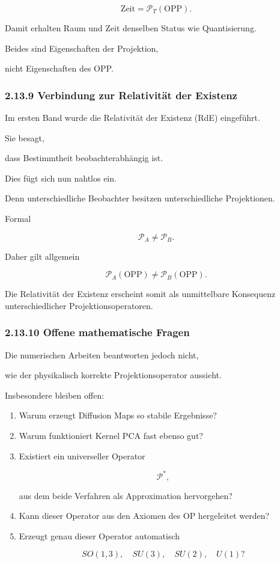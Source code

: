 \[
\boxed{
\text{Zeit}
=
\mathcal P_T(\mathrm{OPP}).
}
\]

Damit erhalten Raum und Zeit denselben Status wie Quantisierung.

Beides sind Eigenschaften der Projektion,

nicht Eigenschaften des OPP.


\subsubsection*{2.13.9 Verbindung zur Relativität der Existenz}

Im ersten Band wurde die Relativität der Existenz (RdE) eingeführt.

Sie besagt,

dass Bestimmtheit beobachterabhängig ist.

Dies fügt sich nun nahtlos ein.

Denn unterschiedliche Beobachter besitzen unterschiedliche Projektionen.

Formal

\[
\mathcal P_A
\neq
\mathcal P_B.
\]

Daher gilt allgemein

\[
\boxed{
\mathcal P_A(\mathrm{OPP})
\neq
\mathcal P_B(\mathrm{OPP}).
}
\]

Die Relativität der Existenz erscheint somit als unmittelbare Konsequenz
unterschiedlicher Projektionsoperatoren.


\subsubsection*{2.13.10 Offene mathematische Fragen}

Die numerischen Arbeiten beantworten jedoch nicht,

wie der physikalisch korrekte Projektionsoperator aussieht.

Insbesondere bleiben offen:

\begin{enumerate}

\item
Warum erzeugt Diffusion Maps so stabile Ergebnisse?

\item
Warum funktioniert Kernel PCA fast ebenso gut?

\item
Existiert ein universeller Operator

\[
\mathcal P^\ast,
\]

aus dem beide Verfahren als Approximation hervorgehen?

\item
Kann dieser Operator aus den Axiomen des OP hergeleitet werden?

\item
Erzeugt genau dieser Operator automatisch

\[
SO(1,3),
\quad
SU(3),
\quad
SU(2),
\quad
U(1)?
\]

\end{enumerate}

